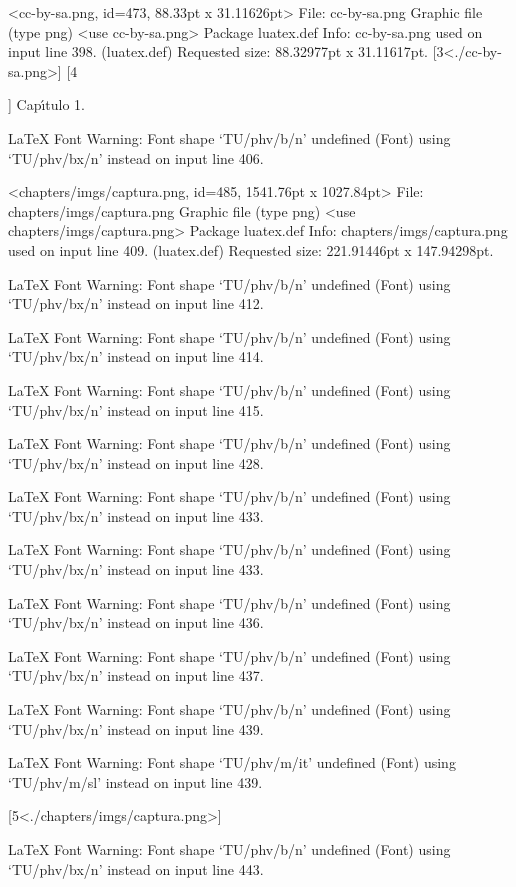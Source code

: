 <cc-by-sa.png, id=473, 88.33pt x 31.11626pt>
File: cc-by-sa.png Graphic file (type png)
<use cc-by-sa.png>
Package luatex.def Info: cc-by-sa.png  used on input line 398.
(luatex.def)             Requested size: 88.32977pt x 31.11617pt.
[3<./cc-by-sa.png>] [4

]
Cap\'{\i }tulo 1.

LaTeX Font Warning: Font shape `TU/phv/b/n' undefined
(Font)              using `TU/phv/bx/n' instead on input line 406.

<chapters/imgs/captura.png, id=485, 1541.76pt x 1027.84pt>
File: chapters/imgs/captura.png Graphic file (type png)
<use chapters/imgs/captura.png>
Package luatex.def Info: chapters/imgs/captura.png  used on input line 409.
(luatex.def)             Requested size: 221.91446pt x 147.94298pt.

LaTeX Font Warning: Font shape `TU/phv/b/n' undefined
(Font)              using `TU/phv/bx/n' instead on input line 412.


LaTeX Font Warning: Font shape `TU/phv/b/n' undefined
(Font)              using `TU/phv/bx/n' instead on input line 414.


LaTeX Font Warning: Font shape `TU/phv/b/n' undefined
(Font)              using `TU/phv/bx/n' instead on input line 415.


LaTeX Font Warning: Font shape `TU/phv/b/n' undefined
(Font)              using `TU/phv/bx/n' instead on input line 428.


LaTeX Font Warning: Font shape `TU/phv/b/n' undefined
(Font)              using `TU/phv/bx/n' instead on input line 433.


LaTeX Font Warning: Font shape `TU/phv/b/n' undefined
(Font)              using `TU/phv/bx/n' instead on input line 433.


LaTeX Font Warning: Font shape `TU/phv/b/n' undefined
(Font)              using `TU/phv/bx/n' instead on input line 436.


LaTeX Font Warning: Font shape `TU/phv/b/n' undefined
(Font)              using `TU/phv/bx/n' instead on input line 437.


LaTeX Font Warning: Font shape `TU/phv/b/n' undefined
(Font)              using `TU/phv/bx/n' instead on input line 439.


LaTeX Font Warning: Font shape `TU/phv/m/it' undefined
(Font)              using `TU/phv/m/sl' instead on input line 439.

[5<./chapters/imgs/captura.png>]

LaTeX Font Warning: Font shape `TU/phv/b/n' undefined
(Font)              using `TU/phv/bx/n' instead on input line 443.


